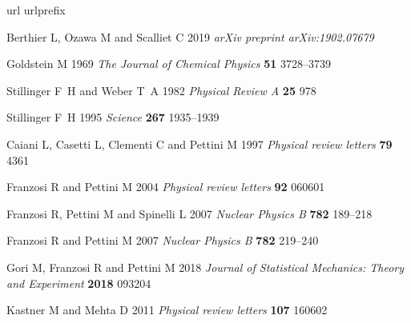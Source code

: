 \documentclass[default,iicol]{sn-jnl}%
\theoremstyle{thmstyleone}%
\theoremstyle{thmstyletwo}%
\theoremstyle{thmstylethree}%
\begin{document}

\providecommand{\newblock}{}
\begin{thebibliography}{10}
	\expandafter\ifx\csname url\endcsname\relax
	\def\url#1{{\tt #1}}\fi
	\expandafter\ifx\csname urlprefix\endcsname\relax\def\urlprefix{URL }\fi
	\providecommand{\eprint}[2][]{\url{#2}}
	
	Berthier L, Ozawa M and Scalliet C 2019 {\em arXiv preprint arXiv:1902.07679\/}
	
	Goldstein M 1969 {\em The Journal of Chemical Physics\/} {\bf 51} 3728–3739
	
	Stillinger F~H and Weber T~A 1982 {\em Physical Review A\/} {\bf 25} 978
	
	Stillinger F~H 1995 {\em Science\/} {\bf 267} 1935–1939
	
	Caiani L, Casetti L, Clementi C and Pettini M 1997 {\em Physical review
		letters\/} {\bf 79} 4361
	
	Franzosi R and Pettini M 2004 {\em Physical review letters\/} {\bf 92} 060601
	
	Franzosi R, Pettini M and Spinelli L 2007 {\em Nuclear Physics B\/} {\bf 782}
	189–218
	
	Franzosi R and Pettini M 2007 {\em Nuclear Physics B\/} {\bf 782} 219–240
	
	Gori M, Franzosi R and Pettini M 2018 {\em Journal of Statistical Mechanics:
		Theory and Experiment\/} {\bf 2018} 093204
	
	Kastner M and Mehta D 2011 {\em Physical review letters\/} {\bf 107} 160602
	

\end{thebibliography}
\end{document}
